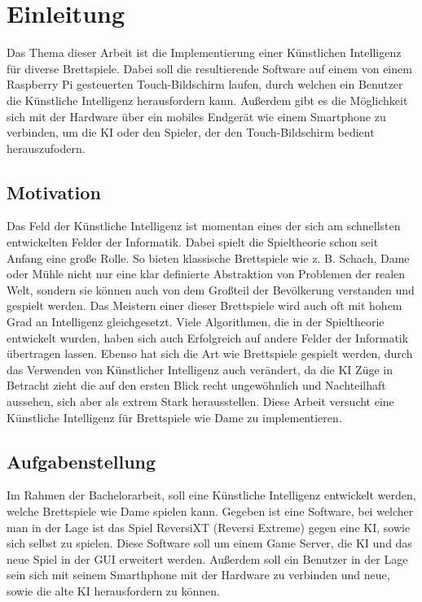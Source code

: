 \documentclass[12pt,a4paper,bibliography=totocnumbered,listof=totocnumbered]{article}
\begin{document}
\section{Einleitung}
Das Thema dieser Arbeit ist die Implementierung einer Künstlichen Intelligenz für diverse
Brettspiele. Dabei soll die resultierende Software auf einem von einem Raspberry Pi gesteuerten 
Touch-Bildschirm laufen, durch welchen ein Benutzer die Künstliche Intelligenz herausfordern kann.
Außerdem gibt es die Möglichkeit sich mit der Hardware über ein mobiles Endgerät wie einem 
Smartphone zu verbinden, um die KI oder den Spieler, der den Touch-Bildschirm bedient 
herauszufodern.

\subsection{Motivation}
Das Feld der Künstliche Intelligenz ist momentan eines der sich am schnellsten 
entwickelten Felder der Informatik. Dabei spielt die Spieltheorie schon seit Anfang eine 
große Rolle. So bieten klassische Brettspiele wie z. B. Schach, Dame oder Mühle nicht nur 
eine klar definierte Abstraktion von Problemen der realen Welt, sondern sie können auch von
dem Großteil der Bevölkerung verstanden und gespielt werden. Das Meistern einer dieser 
Brettspiele wird auch oft mit hohem Grad an Intelligenz gleichgesetzt. Viele Algorithmen,
die in der Spieltheorie entwickelt wurden, haben sich auch Erfolgreich auf andere Felder
der Informatik übertragen lassen. Ebenso hat sich die Art wie Brettspiele gespielt werden, 
durch das Verwenden von Künstlicher Intelligenz auch verändert, da die KI Züge in Betracht 
zieht die auf den ersten Blick recht ungewöhnlich und Nachteilhaft aussehen, sich aber als 
extrem Stark herausstellen. Diese Arbeit versucht eine Künstliche Intelligenz für 
Brettspiele wie Dame zu implementieren.

\subsection{Aufgabenstellung}
Im Rahmen der Bachelorarbeit, soll eine Künstliche Intelligenz entwickelt werden, welche 
Brettspiele wie Dame spielen kann. Gegeben ist eine Software, bei welcher man in der Lage ist
das Spiel ReversiXT (Reversi Extreme) gegen eine KI, sowie sich selbst zu spielen. Diese 
Software soll um einem Game Server, die KI und das neue Spiel in der GUI erweitert werden.
Außerdem soll ein Benutzer in der Lage sein sich mit seinem Smarthphone mit der Hardware zu 
verbinden und neue, sowie die alte KI herausfordern zu können.
\end{document}
